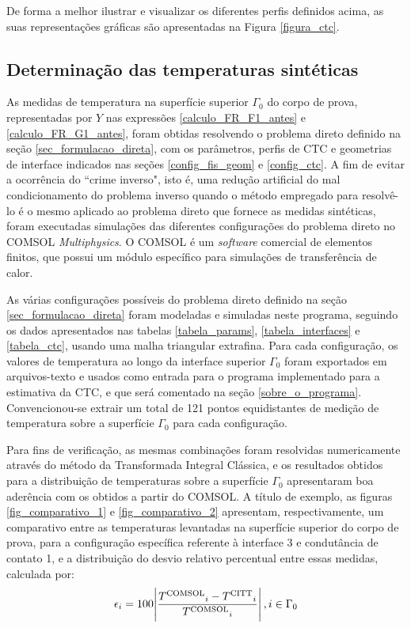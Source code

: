 De forma a melhor ilustrar e visualizar os diferentes perfis definidos acima, as suas representações gráficas são apresentadas na Figura \ref{figura_ctc}.



\subsection{Determinação das temperaturas sintéticas}

As medidas de temperatura na superfície superior $\Gamma_0$ do corpo de prova, representadas por $Y$ nas expressões \eqref{calculo_FR_F1_antes} e \eqref{calculo_FR_G1_antes}, foram obtidas resolvendo o problema direto definido na seção \ref{sec_formulacao_direta}, com os parâmetros, perfis de CTC e geometrias de interface indicados nas seções \ref{config_fis_geom} e \ref{config_ctc}. A fim de evitar a ocorrência do ``crime inverso", isto é, uma redução artificial do mal condicionamento do problema inverso quando o método empregado para resolvê-lo é o mesmo aplicado ao problema direto que fornece as medidas sintéticas\citep{livro_kaipio}, foram executadas simulações das diferentes configurações do problema direto no COMSOL \textit{Multiphysics}\textsuperscript{\textregistered}. O COMSOL é um \textit{software} comercial de elementos finitos, que possui um módulo específico para simulações de transferência de calor.

As várias configurações possíveis do problema direto definido na seção \ref{sec_formulacao_direta} foram modeladas e simuladas neste programa, seguindo os dados apresentados nas tabelas \ref{tabela_params}, \ref{tabela_interfaces} e \ref{tabela_ctc}, usando uma malha triangular extrafina. Para cada configuração, os valores de temperatura ao longo da interface superior $\Gamma_0$ foram exportados em arquivos-texto e usados como entrada para o programa implementado para a estimativa da CTC, e que será comentado na seção \ref{sobre_o_programa}. Convencionou-se extrair um total de 121 pontos equidistantes de medição de temperatura sobre a superfície $\Gamma_0$ para cada configuração.

Para fins de verificação, as mesmas combinações foram resolvidas numericamente através do método da Transformada Integral Clássica, e os resultados obtidos para a distribuição de temperaturas sobre a superfície $\Gamma_0$ apresentaram boa aderência com os obtidos a partir do COMSOL. A título de exemplo, as figuras \ref{fig_comparativo_1} e \ref{fig_comparativo_2} apresentam, respectivamente, um comparativo entre as temperaturas levantadas na superfície superior do corpo de prova, para a configuração específica referente à interface 3 e condutância de contato 1, e a distribuição do desvio relativo percentual entre essas medidas, calculada por:
\begin{align}
\epsilon_i = 100\abs{\frac{T\textsuperscript{COMSOL}_i - T\textsuperscript{CITT}_i}{T\textsuperscript{COMSOL}_i}}, i \in \Gamma_0
\end{align}

